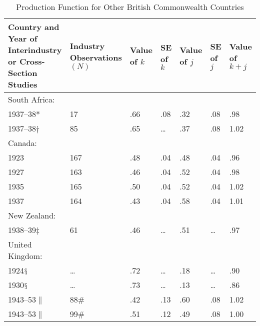 \documentclass{article}
\begin{document}
\begin{table}[!t]
\centering
\footnotesize{
\caption{Production Function for Other British Commonwealth Countries}%
\label{tab3}%
\begin{tabular}{p{}p{}p{}p{}p{}p{}p{}}
\hline
\hline
Country and Year of Interindustry or Cross-Section Studies & Industry Observations \((N)\) & Value of \(k\) & SE of \(k\) & Value of \(j\) & SE of \(j\) & Value of \(k + j\)\\
\hline
South Africa: &  &  &  &  &  & \\
\hspace{3mm} 1937--38* & 17 & .66 & .08 & .32 & .08 & .98\\
\hspace{3mm} 1937--38$\dagger$ & 85 & .65 & \dots & .37 & .08 & 1.02\\
Canada: &  &  &  &  &  & \\
\hspace{3mm} 1923 & 167 & .48 & .04 & .48 & .04 & .96\\
\hspace{3mm} 1927 & 163 & .46 & .04 & .52 & .04 & .98\\
\hspace{3mm} 1935 & 165 & .50 & .04 & .52 & .04 & 1.02\\
\hspace{3mm} 1937 & 164 & .43 & .04 & .58 & .04 & 1.01\\
New Zealand: &  &  &  &  &  & \\
\hspace{3mm} 1938--39$\ddagger$ & 61 & .46 & \dots & .51 & \dots & .97\\
United Kingdom: &  &  &  &  &  & \\
\hspace{3mm} 1924$\mathsection$ & \dots & .72 & \dots & .18 & \dots & .90\\
\hspace{3mm} 1930$\mathsection$ & \dots & .73 & \dots & .13 & \dots & .86\\
\hspace{3mm} 1943--53$\|$ & 88$\#$ & .42 & .13 & .60 & .08 & 1.02\\
\hspace{3mm} 1943--53$\|$ & 99$\#$ & .51 & .12 & .49 & .08 & 1.00\\


\end{tabular}}
\end{table}
\end{document}
